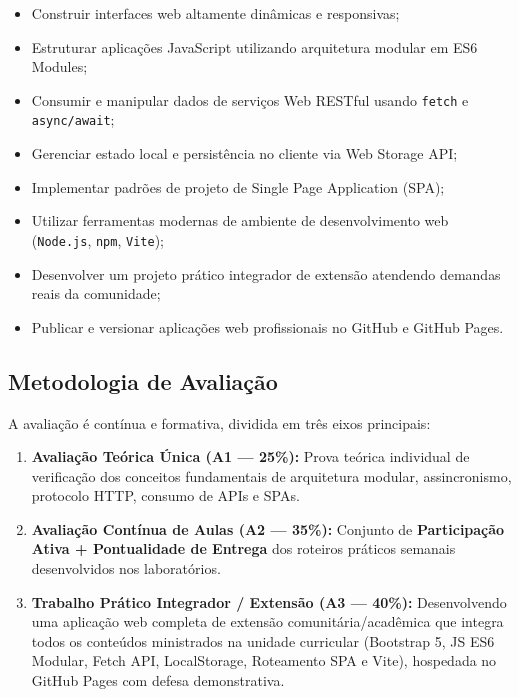 \begin{itemize}
    \item Construir interfaces web altamente dinâmicas e responsivas;
    \item Estruturar aplicações JavaScript utilizando arquitetura modular em ES6 Modules;
    \item Consumir e manipular dados de serviços Web RESTful usando \texttt{fetch} e \texttt{async/await};
    \item Gerenciar estado local e persistência no cliente via Web Storage API;
    \item Implementar padrões de projeto de Single Page Application (SPA);
    \item Utilizar ferramentas modernas de ambiente de desenvolvimento web (\texttt{Node.js}, \texttt{npm}, \texttt{Vite});
    \item Desenvolver um projeto prático integrador de extensão atendendo demandas reais da comunidade;
    \item Publicar e versionar aplicações web profissionais no GitHub e GitHub Pages.
\end{itemize}

\subsection*{Metodologia de Avaliação}

A avaliação é contínua e formativa, dividida em três eixos principais:

\begin{enumerate}
    \item \textbf{Avaliação Teórica Única (A1 — 25\%):} Prova teórica individual de verificação dos conceitos fundamentais de arquitetura modular, assincronismo, protocolo HTTP, consumo de APIs e SPAs.
    \item \textbf{Avaliação Contínua de Aulas (A2 — 35\%):} Conjunto de \textbf{Participação Ativa + Pontualidade de Entrega} dos roteiros práticos semanais desenvolvidos nos laboratórios.
    \item \textbf{Trabalho Prático Integrador / Extensão (A3 — 40\%):} Desenvolvendo uma aplicação web completa de extensão comunitária/acadêmica que integra todos os conteúdos ministrados na unidade curricular (Bootstrap 5, JS ES6 Modular, Fetch API, LocalStorage, Roteamento SPA e Vite), hospedada no GitHub Pages com defesa demonstrativa.
\end{enumerate}
